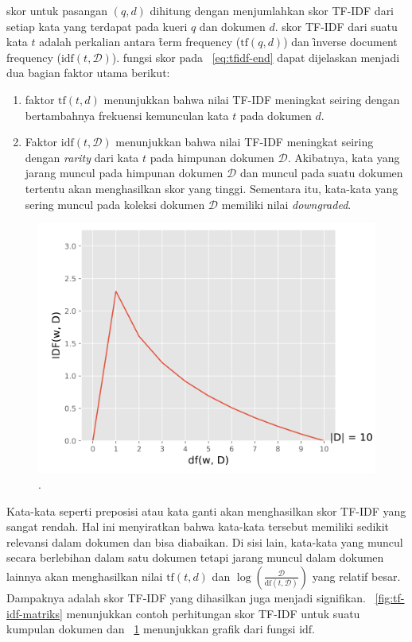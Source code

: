     skor untuk pasangan $(q,d)$ dihitung dengan menjumlahkan skor TF-IDF dari setiap kata yang terdapat pada kueri $q$ dan dokumen $d$. skor TF-IDF dari suatu kata $t$ adalah perkalian antara \f{term frequency} ($\text{tf}(q,d)$) dan \f{inverse document frequency} ($\text{idf}(t,\mathcal{D})$). fungsi skor pada \equ~\ref{eq:tfidf-end} dapat dijelaskan menjadi dua bagian faktor utama berikut:

    \begin{enumerate}
        \item faktor $\text{tf}(t, d)$ menunjukkan bahwa nilai TF-IDF meningkat seiring dengan bertambahnya frekuensi kemunculan kata $t$ pada dokumen $d$.
        \item Faktor $\text{idf}(t, \mathcal{D})$ menunjukkan bahwa nilai TF-IDF meningkat seiring dengan \textit{rarity} dari kata $t$ pada himpunan dokumen $\mathcal{D}$. Akibatnya, kata yang jarang muncul pada himpunan dokumen $\mathcal{D}$ dan muncul pada suatu dokumen tertentu akan menghasilkan skor yang tinggi. Sementara itu, kata-kata yang sering muncul pada koleksi dokumen $\mathcal{D}$ memiliki nilai \textit{downgraded}.
    \end{enumerate}

    \begin{figure}
        \centering
        \includegraphics[width=1\textwidth]{assets/pics/idf-graph.png}
        \caption{\license.}
        \label{fig:idf-graph}
    \end{figure}
    
    Kata-kata seperti preposisi atau kata ganti akan menghasilkan skor TF-IDF yang sangat rendah. Hal ini menyiratkan bahwa kata-kata tersebut memiliki sedikit relevansi dalam dokumen dan bisa diabaikan. Di sisi lain, kata-kata yang muncul secara berlebihan dalam satu dokumen tetapi jarang muncul dalam dokumen lainnya akan menghasilkan nilai $\text{tf}(t, d)$ dan $\log \left(\frac{\mathcal{D}}{\text{df}(t, \mathcal{D})}\right)$ yang relatif besar. Dampaknya adalah skor TF-IDF yang dihasilkan juga menjadi signifikan. \pic~\ref{fig:tf-idf-matriks} menunjukkan contoh perhitungan skor TF-IDF untuk suatu kumpulan dokumen dan \pic~\ref{fig:idf-graph} menunjukkan grafik dari fungsi $\text{idf}$.
    
